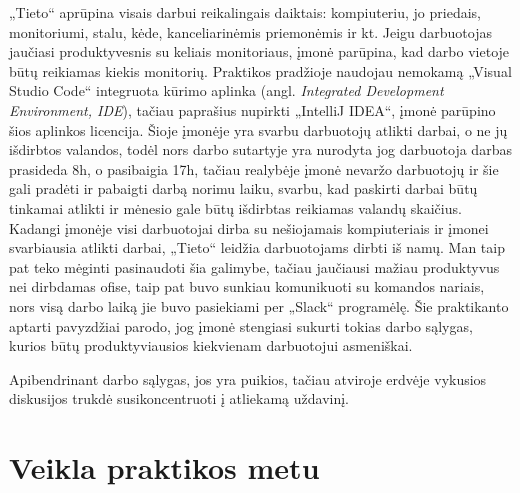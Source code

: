 \documentclass{VUMIFPSbakalaurinis}
\begin{document}
„Tieto“ aprūpina visais darbui reikalingais daiktais: kompiuteriu, jo priedais, monitoriumi, stalu, kėde, kanceliarinėmis priemonėmis ir kt. Jeigu darbuotojas jaučiasi produktyvesnis su keliais monitoriaus, įmonė parūpina, kad darbo vietoje būtų reikiamas kiekis monitorių. Praktikos pradžioje naudojau nemokamą „Visual Studio Code“ integruota kūrimo aplinka (angl. \textit{Integrated Development Environment, IDE}), tačiau paprašius nupirkti „IntelliJ IDEA“, įmonė parūpino šios aplinkos licencija. Šioje įmonėje yra svarbu darbuotojų atlikti darbai, o ne jų išdirbtos valandos, todėl nors darbo sutartyje yra nurodyta jog darbuotoja darbas prasideda 8h, o pasibaigia 17h, tačiau realybėje įmonė nevaržo darbuotojų ir šie gali pradėti ir pabaigti darbą norimu laiku, svarbu, kad paskirti darbai būtų tinkamai atlikti ir mėnesio gale būtų išdirbtas reikiamas valandų skaičius. Kadangi įmonėje visi darbuotojai dirba su nešiojamais kompiuteriais ir įmonei svarbiausia atlikti darbai, „Tieto“ leidžia darbuotojams dirbti iš namų. Man taip pat teko mėginti pasinaudoti šia galimybe, tačiau jaučiausi mažiau produktyvus nei dirbdamas ofise, taip pat buvo sunkiau komunikuoti su komandos nariais, nors visą darbo laiką jie buvo pasiekiami per „Slack“ programėlę. Šie praktikanto aptarti pavyzdžiai parodo, jog įmonė stengiasi sukurti tokias darbo sąlygas, kurios būtų produktyviausios kiekvienam darbuotojui asmeniškai. 

Apibendrinant darbo sąlygas, jos yra puikios, tačiau atviroje erdvėje vykusios diskusijos trukdė susikoncentruoti į atliekamą uždavinį.
\section{Veikla praktikos metu}
\end{document}
